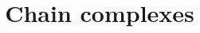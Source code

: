 \documentclass{ximera}
\title{Chain complexes}
\begin{document}
\begin{abstract}

\end{abstract}
\maketitle

\end{document}
